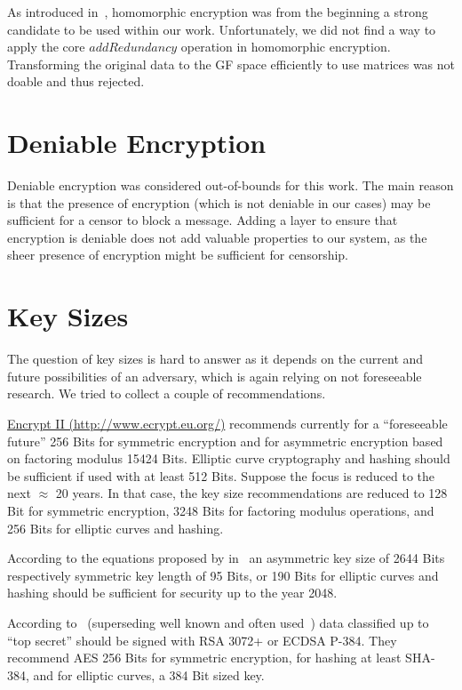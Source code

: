 As introduced in~\cite{feldman1987practical}, homomorphic encryption was from the beginning a strong candidate to be used within our work. Unfortunately, we did not find a way to apply the core $addRedundancy$ operation in homomorphic encryption. Transforming the original data to the GF space efficiently to use matrices was not doable and thus rejected.


\section{Deniable Encryption}
Deniable encryption was considered out-of-bounds for this work. The main reason is that the presence of encryption (which is not deniable in our cases) may be sufficient for a censor to block a message. Adding a layer to ensure that encryption is deniable does not add valuable properties to our system, as the sheer presence of encryption might be sufficient for censorship. 

\section{Key Sizes}\label{sec:keySize}
The question of key sizes is hard to answer as it depends on the current and future possibilities of an adversary, which is again relying on not foreseeable research. We tried to collect a couple of recommendations.

\href{http://www.ecrypt.eu.org/}{Encrypt II (http://www.ecrypt.eu.org/)} recommends currently for a ``foreseeable future'' 256 Bits for symmetric encryption and for asymmetric encryption based on factoring modulus 15424 Bits. Elliptic curve cryptography and hashing should be sufficient if used with at least 512 Bits. Suppose the focus is reduced to the next $\approx$ 20 years. In that case, the key size recommendations are reduced to 128 Bit for symmetric encryption, 3248 Bits for factoring modulus operations, and 256 Bits for elliptic curves and hashing.

According to the equations proposed by \citeauthor{Lenstra04keylength.} in~\cite{Lenstra04keylength.} an asymmetric key size of 2644 Bits respectively symmetric key length of 95 Bits, or 190 Bits for elliptic curves and hashing should be sufficient for security up to the year 2048. 

According to~\cite{CNSASuite} (superseding well known and often used~\cite{nsa-fact-sheet-B}) data classified up to ``top secret'' should be signed with RSA 3072+ or ECDSA P-384.  They recommend AES 256 Bits for symmetric encryption, for hashing at least SHA-384, and for elliptic curves, a 384 Bit sized key.

